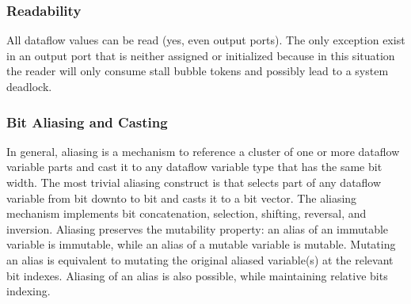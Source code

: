 \subsubsection{Readability}
All dataflow values can be read (yes, even output ports). The only exception exist in an output port that is neither assigned or initialized because in this situation the reader will only consume stall bubble tokens and possibly lead to a system deadlock.

\subsubsection{Bit Aliasing and Casting} 
In general, aliasing is a mechanism to reference a cluster of one or more dataflow variable parts and cast it to any dataflow variable type that has the same bit width. The most trivial aliasing construct is  that selects part of any dataflow variable from bit  downto to bit  and casts it to a bit vector. The aliasing mechanism implements bit concatenation, selection, shifting, reversal, and inversion. Aliasing preserves the mutability property: an alias of an immutable variable is immutable, while an alias of a mutable variable is mutable. Mutating an alias is equivalent to mutating the original aliased variable(s) at the relevant bit indexes. Aliasing of an alias is also possible, while maintaining relative bits indexing.  

